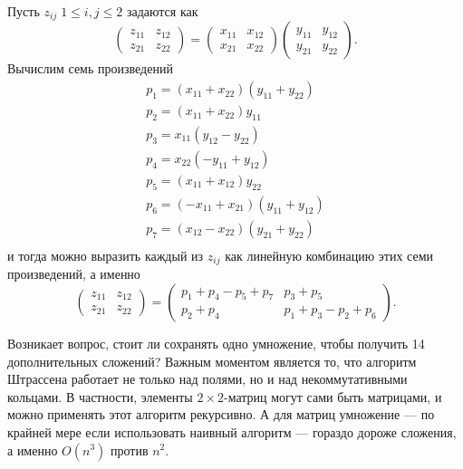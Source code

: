 Пусть $z_{ij}\; 1 \leq i,j \leq 2$ задаются как
\[
	\left( 
	\begin{array}{cc}
	  z_{11} & z_{12}\\
	  z_{21} & z_{22}
	\end{array}
	 \right)=
	 \left( 
	\begin{array}{cc}
	  x_{11} & x_{12}\\
	  x_{21} & x_{22}
	\end{array}
	 \right)
	 \left( 
	\begin{array}{cc}
	  y_{11} & y_{12}\\
	  y_{21} & y_{22}
	\end{array}
	 \right).
\]
Вычислим семь произведений
\[
	\begin{array}{l}
	  p_1=(x_{11}+x_{22})(y_{11}+y_{22})\\
  	  p_2=(x_{11}+x_{22})y_{11}\\
  	  p_3=x_{11}(y_{12}-y_{22})\\
  	  p_4=x_{22}(-y_{11}+y_{12})\\
  	  p_5=(x_{11}+x_{12})y_{22}\\
  	  p_6=(-x_{11}+x_{21})(y_{11}+y_{12})\\
  	  p_7=(x_{12}-x_{22})(y_{21}+y_{22})\\
	\end{array}
\]
и тогда можно выразить каждый из $z_{ij}$ как линейную комбинацию этих семи произведений, а именно
\[
	\left( 
	\begin{array}{cc}
	  z_{11} & z_{12}\\
	  z_{21} & z_{22}
	\end{array}
	 \right)=
	 \left( 
	\begin{array}{cc}
	  p_1+p_4-p_5+p_7 & p_3+p_5\\
	  p_2+p_4 & p_1+p_3-p_2+p_6
	\end{array}
	 \right).
\]

Возникает вопрос, стоит ли сохранять одно умножение, чтобы получить 14 дополнительных сложений? Важным моментом является то, что алгоритм Штрассена работает не только над полями, но и над некоммутативными кольцами. В частности, элементы $2 \times 2$-матриц могут сами быть матрицами, и можно применять этот алгоритм рекурсивно. А для матриц умножение --- по крайней мере если использовать наивный алгоритм --- гораздо дороже сложения, а именно \hyperref[o_notation]{$O(n^3)$} против $n^2$.










